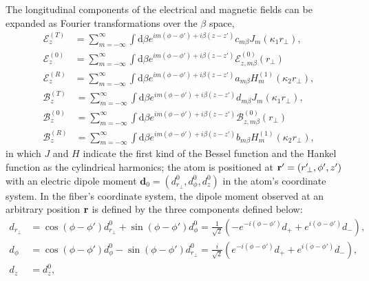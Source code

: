 \documentclass[preprint,aps,pra,onecolumn]{revtex4-1} %
\begin{document}
The longitudinal components of the electrical and magnetic fields can be expanded as Fourier transformations over the $ \beta $ space,
\begin{subequations}\label{ET0Rexpand}
\begin{align}
\mathcal{E}^{(T)}_z
&= \sum_{m=-\infty}^\infty \int \mathrm{d}\beta e^{im(\phi-\phi') + i\beta (z-z')} c_{m\beta} J_m (\kappa_1r\!_\perp),\\
\mathcal{E}^{(0)}_{z} &= \sum_{m=-\infty}^\infty \int \mathrm{d}\beta e^{im(\phi-\phi') + i\beta (z-z')} \mathcal{E}^{(0)}_{z,m\beta}(r\!_\perp)\\
\mathcal{E}^{(R)}_z 
&= \sum_{m=-\infty}^\infty \int \mathrm{d}\beta e^{im(\phi-\phi') + i\beta (z-z')} a_{m\beta} H_m^{(1)} (\kappa_2r\!_\perp),
\end{align}
\end{subequations}
\begin{subequations}\label{BT0Rexpand}
\begin{align}
\mathcal{B}^{(T)}_z 
&= \sum_{m=-\infty}^\infty \int \mathrm{d}\beta e^{im(\phi-\phi') + i\beta (z-z')} d_{m\beta} J_m (\kappa_1r\!_\perp),\\
\mathcal{B}^{(0)}_{z} &= \sum_{m=-\infty}^\infty \int \mathrm{d}\beta e^{im(\phi-\phi') + i\beta (z-z')} \mathcal{B}^{(0)}_{z,m\beta}(r\!_\perp)\\
\mathcal{B}^{(R)}_z 
&= \sum_{m=-\infty}^\infty \int \mathrm{d}\beta e^{im(\phi-\phi') + i\beta (z-z')} b_{m\beta} H_m^{(1)} (\kappa_2r\!_\perp),
\end{align}
\end{subequations}
in which $J$ and $H$ indicate the first kind of the Bessel function and the Hankel function as the cylindrical harmonics; the atom is positioned at $\mathbf{r}'=(r^\prime\!_\perp,\phi',z')$ with an electric dipole moment $\mathbf{d}_0=(d^0_{r\!_\perp}, d^0_\phi,d^0_z)$ in the atom's coordinate system. In the fiber's coordinate system, the dipole moment observed at an arbitrary position $\mathbf{r}$ is defined by the three components defined below:
\begin{align}
d_{r\!_\perp}\! &= \cos(\phi\!-\!\phi')d^0_{r\!_\perp}\!\!+\!\sin(\phi\!-\!\phi')d^0_\phi=\frac{1}{\sqrt{2}}\left(-e^{-i(\phi\!-\!\phi')}d_++e^{i(\phi\!-\!\phi')}d_- \right),\\
d_\phi &=\cos(\phi\!-\!\phi')d^0_\phi\!-\!\sin(\phi\!-\!\phi')d^0_{r\!_\perp}=\frac{i}{\sqrt{2}}\left(e^{-i(\phi\!-\!\phi')}d_++e^{i(\phi\!-\!\phi')}d_- \right),\\
d_z &= d^0_z,
\end{align}
\end{document}
